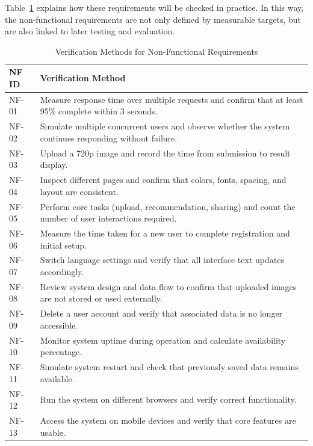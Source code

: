 Table~\ref{tab:NFR_verification} explains how these requirements will be checked in practice. In this way, the non-functional requirements are not only defined by measurable targets, but are also linked to later testing and evaluation.

\newpage
\begin{table}[h]
\centering
\small
\caption{Verification Methods for Non-Functional Requirements}
\label{tab:NFR_verification}
\renewcommand{\arraystretch}{1.2}
\begin{tabular}{p{1.8cm}p{11cm}}
\toprule
\textbf{NF ID} & \textbf{Verification Method} \\
\midrule

NF-01 & Measure response time over multiple requests and confirm that at least 95\% complete within 3 seconds. \\

NF-02 & Simulate multiple concurrent users and observe whether the system continues responding without failure. \\

NF-03 & Upload a 720p image and record the time from submission to result display. \\

NF-04 & Inspect different pages and confirm that colors, fonts, spacing, and layout are consistent. \\

NF-05 & Perform core tasks (upload, recommendation, sharing) and count the number of user interactions required. \\

NF-06 & Measure the time taken for a new user to complete registration and initial setup. \\

NF-07 & Switch language settings and verify that all interface text updates accordingly. \\

NF-08 & Review system design and data flow to confirm that uploaded images are not stored or used externally. \\

NF-09 & Delete a user account and verify that associated data is no longer accessible. \\

NF-10 & Monitor system uptime during operation and calculate availability percentage. \\

NF-11 & Simulate system restart and check that previously saved data remains available. \\

NF-12 & Run the system on different browsers and verify correct functionality. \\

NF-13 & Access the system on mobile devices and verify that core features are usable. \\

\bottomrule
\end{tabular}
\end{table}

